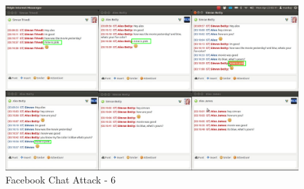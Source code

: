\begin{figure}[H]
\centering
\includegraphics[scale=0.6, angle=90]{project/diagrams/attack6}
\caption{Facebook Chat Attack - 6}
\label{fig:attack1}
\end{figure}


